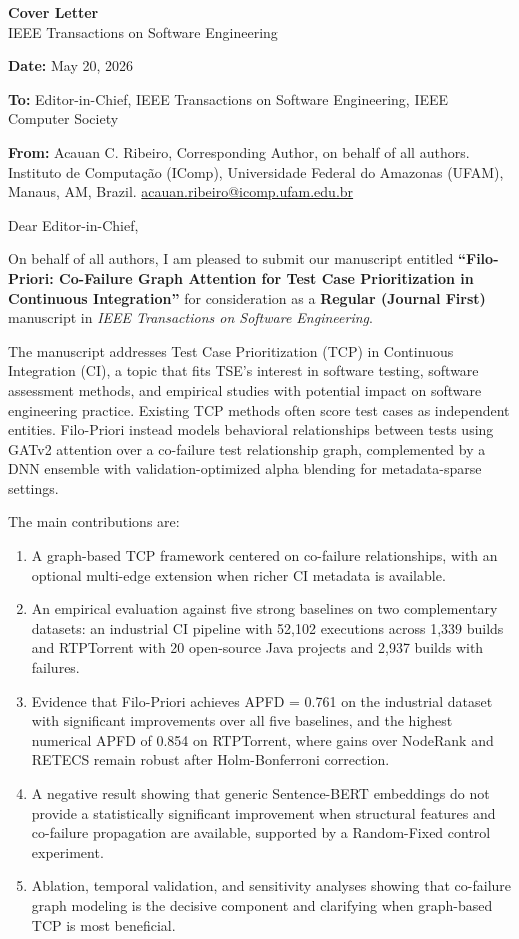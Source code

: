 \documentclass[11pt]{article}
\begin{document}
\noindent\textbf{\large Cover Letter}\\[2pt]
\noindent IEEE Transactions on Software Engineering

\medskip
\noindent\textbf{Date:} May 20, 2026

\noindent\textbf{To:} Editor-in-Chief, IEEE Transactions on Software
Engineering, IEEE Computer Society

\noindent\textbf{From:} Acauan C. Ribeiro, Corresponding Author, on behalf of
all authors. Instituto de Computação (IComp), Universidade Federal do Amazonas
(UFAM), Manaus, AM, Brazil. \href{mailto:acauan.ribeiro@icomp.ufam.edu.br}{acauan.ribeiro@icomp.ufam.edu.br}

\hrulefill

\medskip
Dear Editor-in-Chief,

On behalf of all authors, I am pleased to submit our manuscript entitled
\textbf{``Filo-Priori: Co-Failure Graph Attention for Test Case Prioritization
in Continuous Integration''} for consideration as a \textbf{Regular (Journal
First)} manuscript in \textit{IEEE Transactions on Software Engineering}.

The manuscript addresses Test Case Prioritization (TCP) in Continuous
Integration (CI), a topic that fits TSE's interest in software testing,
software assessment methods, and empirical studies with potential impact on
software engineering practice. Existing TCP methods often score test cases as
independent entities. Filo-Priori instead models behavioral relationships
between tests using GATv2 attention over a co-failure test relationship graph,
complemented by a DNN ensemble with validation-optimized alpha blending for
metadata-sparse settings.

\noindent The main contributions are:
\begin{enumerate}[topsep=2pt,itemsep=1pt]
  \item A graph-based TCP framework centered on co-failure relationships, with
  an optional multi-edge extension when richer CI metadata is available.
  \item An empirical evaluation against five strong baselines on two
  complementary datasets: an industrial CI pipeline with 52,102 executions
  across 1,339 builds and RTPTorrent with 20 open-source Java projects and
  2,937 builds with failures.
  \item Evidence that Filo-Priori achieves APFD = 0.761 on the industrial
  dataset with significant improvements over all five baselines, and the
  highest numerical APFD of 0.854 on RTPTorrent, where gains over NodeRank and
  RETECS remain robust after Holm-Bonferroni correction.
  \item A negative result showing that generic Sentence-BERT embeddings do not
  provide a statistically significant improvement when structural features and
  co-failure propagation are available, supported by a Random-Fixed control
  experiment.
  \item Ablation, temporal validation, and sensitivity analyses showing that
  co-failure graph modeling is the decisive component and clarifying when
  graph-based TCP is most beneficial.
\end{enumerate}
\end{document}
